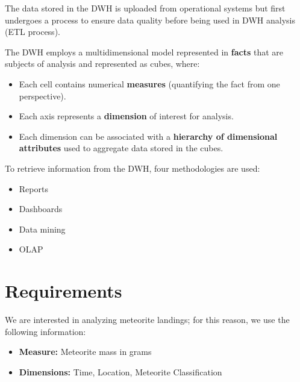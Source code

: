 \documentclass[conference]{IEEEtran}
\begin{document}
	The data stored in the DWH is uploaded from operational systems but first undergoes a process to ensure data quality before being used in DWH analysis (ETL process).

	The DWH employs a multidimensional model represented in \textbf{facts} that are subjects of analysis and represented as cubes, where:
	\begin{itemize}
		\item Each cell contains numerical \textbf{measures} (quantifying the fact from one perspective).
		\item Each axis represents a \textbf{dimension} of interest for analysis.
		\item Each dimension can be associated with a \textbf{hierarchy of dimensional attributes} used to aggregate data stored in the cubes.
	\end{itemize}

	To retrieve information from the DWH, four methodologies are used:
	\begin{itemize}
		\item Reports
		\item Dashboards
		\item Data mining
		\item OLAP
	\end{itemize}
	 
	\section{Requirements}
	\label{sec:requirements}
	We are interested in analyzing meteorite landings; for this reason, we use the following information:
	\begin{itemize}
		\item \textbf{Measure:} Meteorite mass in grams
		\item \textbf{Dimensions:} Time, Location, Meteorite Classification
	\end{itemize}
\end{document}
